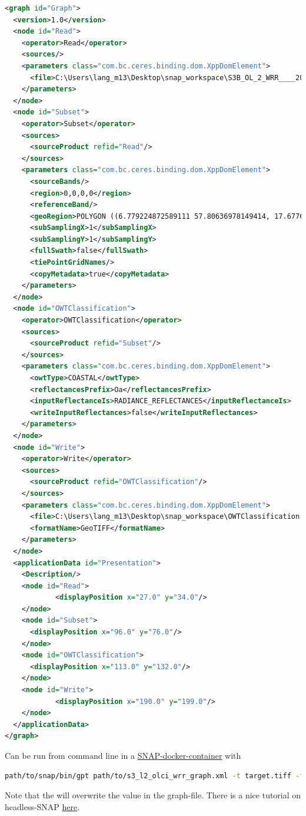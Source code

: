 \begin{lstlisting}[language=xml]
<graph id="Graph">
  <version>1.0</version>
  <node id="Read">
    <operator>Read</operator>
    <sources/>
    <parameters class="com.bc.ceres.binding.dom.XppDomElement">
      <file>C:\Users\lang_m13\Desktop\snap_workspace\S3B_OL_2_WRR____20211103T090328_20211103T094745_20211103T113121_2657_058_378______MAR_O_NR_003.SEN3\xfdumanifest.xml</file>
    </parameters>
  </node>
  <node id="Subset">
    <operator>Subset</operator>
    <sources>
      <sourceProduct refid="Read"/>
    </sources>
    <parameters class="com.bc.ceres.binding.dom.XppDomElement">
      <sourceBands/>
      <region>0,0,0,0</region>
      <referenceBand/>
      <geoRegion>POLYGON ((6.779224872589111 57.80636978149414, 17.677661895751953 57.80636978149414, 17.677661895751953 51.95401382446289, 6.779224872589111 51.95401382446289, 6.779224872589111 57.80636978149414, 6.779224872589111 57.80636978149414))</geoRegion>
      <subSamplingX>1</subSamplingX>
      <subSamplingY>1</subSamplingY>
      <fullSwath>false</fullSwath>
      <tiePointGridNames/>
      <copyMetadata>true</copyMetadata>
    </parameters>
  </node>
  <node id="OWTClassification">
    <operator>OWTClassification</operator>
    <sources>
      <sourceProduct refid="Subset"/>
    </sources>
    <parameters class="com.bc.ceres.binding.dom.XppDomElement">
      <owtType>COASTAL</owtType>
      <reflectancesPrefix>Oa</reflectancesPrefix>
      <inputReflectanceIs>RADIANCE_REFLECTANCES</inputReflectanceIs>
      <writeInputReflectances>false</writeInputReflectances>
    </parameters>
  </node>
  <node id="Write">
    <operator>Write</operator>
    <sources>
      <sourceProduct refid="OWTClassification"/>
    </sources>
    <parameters class="com.bc.ceres.binding.dom.XppDomElement">
      <file>C:\Users\lang_m13\Desktop\snap_workspace\OWTClassification.tif</file>
      <formatName>GeoTIFF</formatName>
    </parameters>
  </node>
  <applicationData id="Presentation">
    <Description/>
    <node id="Read">
            <displayPosition x="27.0" y="34.0"/>
    </node>
    <node id="Subset">
      <displayPosition x="96.0" y="76.0"/>
    </node>
    <node id="OWTClassification">
      <displayPosition x="113.0" y="132.0"/>
    </node>
    <node id="Write">
            <displayPosition x="190.0" y="199.0"/>
    </node>
  </applicationData>
</graph>
\end{lstlisting}

Can be run from command line in a \href{https://hub.docker.com/r/mundialis/esa-snap}{SNAP-docker-container} with 
\begin{lstlisting}[language=bash]
    path/to/snap/bin/gpt path/to/s3_l2_olci_wrr_graph.xml -t target.tiff -f GeoTIFF path/to/sourcefile.xml
\end{lstlisting}
Note that the  will overwrite the  value in the graph-file.
There is a nice tutorial on headless-SNAP \href{http://step.esa.int/docs/tutorials/SNAP_CommandLine_Tutorial.pdf}{here}.

